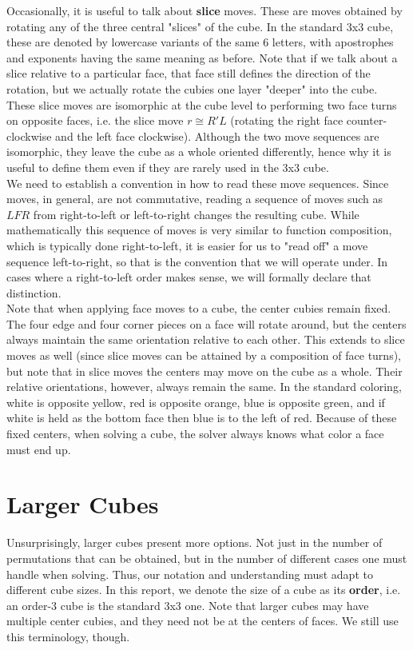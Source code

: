 \documentclass[10pt,letterpaper]{report}
\begin{document}
Occasionally, it is useful to talk about \textbf{slice} moves.  These are moves obtained by rotating any of the three central "slices" of the cube.  In the standard 3x3 cube, these are denoted by lowercase variants of the same 6 letters, with apostrophes and exponents having the same meaning as before.  Note that if we talk about a slice relative to a particular face, that face still defines the direction of the rotation, but we actually rotate the cubies one layer "deeper" into the cube.  These slice moves are isomorphic at the cube level to performing two face turns on opposite faces, i.e. the slice move $r \cong R'L$ (rotating the right face counter-clockwise and the left face clockwise).  Although the two move sequences are isomorphic, they leave the cube as a whole oriented differently, hence why it is useful to define them even if they are rarely used in the 3x3 cube.  \\

We need to establish a convention in how to read these move sequences.  Since moves, in general, are not commutative, reading a sequence of moves such as $LFR$ from right-to-left or left-to-right changes the resulting cube.  While mathematically this sequence of moves is very similar to function composition, which is typically done right-to-left, it is easier for us to "read off" a move sequence left-to-right, so that is the convention that we will operate under.  In cases where a right-to-left order makes sense, we will formally declare that distinction. \\

Note that when applying face moves to a cube, the center cubies remain fixed.  The four edge and four corner pieces on a face will rotate around, but the centers always maintain the same orientation relative to each other.  This extends to slice moves as well (since slice moves can be attained by a composition of face turns), but note that in slice moves the centers may move on the cube as a whole.  Their relative orientations, however, always remain the same.  In the standard coloring, white is opposite yellow, red is opposite orange, blue is opposite green, and if white is held as the bottom face then blue is to the left of red.  Because of these fixed centers, when solving a cube, the solver always knows what color a face must end up.
\section{Larger Cubes}
Unsurprisingly, larger cubes present more options.  Not just in the number of permutations that can be obtained, but in the number of different cases one must handle when solving.  Thus, our notation and understanding must adapt to different cube sizes.  In this report, we denote the size of a cube as its \textbf{order}, i.e. an order-3 cube is the standard 3x3 one.  Note that larger cubes may have multiple center cubies, and they need not be at the centers of faces.  We still use this terminology, though. \\
\end{document}
